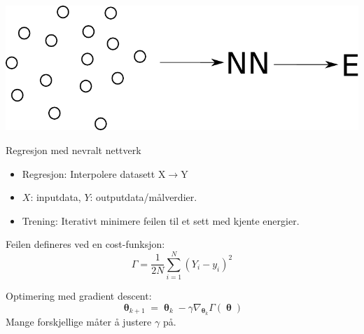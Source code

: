 \documentclass{beamer}
\begin{document}
\begin{frame}
 
\centering
\includegraphics[width=0.9\linewidth]{../Figures/Presentation/interpolation.pdf}
\begin{block}{Regresjon med nevralt nettverk}
 \begin{itemize}
  \item Regresjon: Interpolere datasett $\mathrm{X} \rightarrow \mathrm{Y}$
  \item $X$: inputdata, $Y$: outputdata/målverdier.
  \item Trening: Iterativt minimere feilen til et sett med kjente energier. 
 \end{itemize}
\end{block}

\end{frame}


\begin{frame}
 
\begin{block}{Feilen defineres ved en cost-funksjon:} 
 \begin{equation*}
 \Gamma = \frac{1}{2N}\sum_{i=1}^N (Y_i - y_i)^2
 \end{equation*}
\end{block}

\begin{block}{Optimering med gradient descent:}
 \begin{equation*}
  \mathbf{\uptheta}_{k+1} = \mathbf{\uptheta}_{k} - \gamma \nabla_{\mathbf{\uptheta}_k} \Gamma(\mathbf{\uptheta})
 \end{equation*}
 Mange forskjellige måter å justere $\gamma$ på. 
\end{block}

\end{frame}
\end{document}
